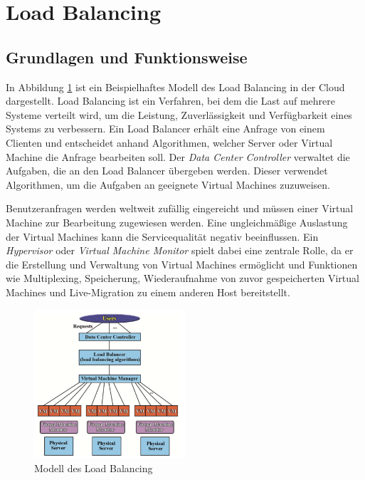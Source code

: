 \documentclass[a4paper,12pt]{article}
\let\stdsection\section
\renewcommand\section{\newpage\stdsection}
\begin{document}
\section{Load Balancing}
\subsection{Grundlagen und Funktionsweise}
In Abbildung \ref{fig:LoadBalancing} ist ein Beispielhaftes Modell des Load Balancing in der Cloud dargestellt. Load Balancing ist ein Verfahren, bei dem die Last auf mehrere Systeme verteilt wird, um die Leistung, Zuverlässigkeit und Verfügbarkeit eines Systems zu verbessern.
Ein Load Balancer erhält eine Anfrage von einem Clienten und entscheidet anhand Algorithmen, welcher Server oder Virtual Machine die Anfrage bearbeiten soll. 
Der \textit{Data Center Controller} verwaltet die Aufgaben, die an den Load Balancer übergeben werden. Dieser verwendet Algorithmen, um die Aufgaben an geeignete Virtual Machines zuzuweisen.

Benutzeranfragen werden weltweit zufällig eingereicht und müssen einer Virtual Machine zur Bearbeitung zugewiesen werden. Eine ungleichmäßige Auslastung der Virtual Machines kann die Servicequalität negativ beeinflussen. Ein \textit{Hypervisor} oder \textit{Virtual Machine Monitor} spielt dabei eine zentrale Rolle, da er die Erstellung und Verwaltung von Virtual Machines ermöglicht und Funktionen wie Multiplexing, Speicherung, Wiederaufnahme von zuvor gespeicherten Virtual Machines und Live-Migration zu einem anderen Host bereitstellt. \cite[S. 2]{LoadBalancing}

\begin{figure}[h]
    \centering
    \includegraphics[width=0.5\textwidth]{images/Load_Balancing.png}
    \caption{Modell des Load Balancing \cite[S. 2]{LoadBalancing}}
    \label{fig:LoadBalancing}
\end{figure}
\end{document}
